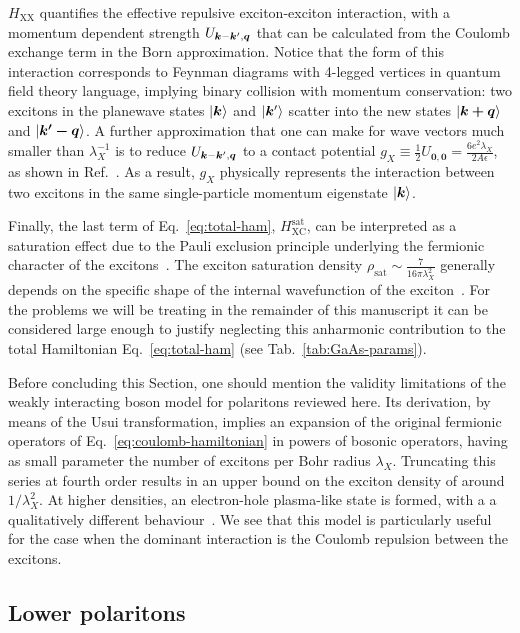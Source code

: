 $H_{\text{XX}}$ quantifies the effective repulsive exciton-exciton
interaction, with a momentum dependent strength
$U_{\bm{k} - \bm{k}^{\prime},\bm{q}}$ that can be calculated from the
Coulomb exchange term in the Born approximation.  Notice that the
form of this interaction corresponds to Feynman diagrams with
4-legged vertices in quantum field theory language, implying binary
collision with momentum conservation: two excitons in the planewave
states $\vert \bm{k} \rangle$ and $\vert \bm{k}^{\prime} \rangle$ scatter into the new
states $\vert \bm{\bm{k}+\bm{q}} \rangle$ and $\vert \bm{\bm{k}^{\prime}-\bm{q}} \rangle$.
A further approximation that one can make for wave vectors much
smaller than $\lambda_X^{-1}$ is to reduce
$U_{\bm{k} - \bm{k}^{\prime},\bm{q}}$ to a contact potential
$g_X \equiv \frac{1}{2} U_{\bm{0},\bm{0}} =
\frac{6e^2\lambda_X}{2A\epsilon}$, as shown in
Ref.~\cite{Ciuti1998}. As a result, $g_X$ physically represents the
interaction between two excitons in the same single-particle momentum
eigenstate $\vert \bm{k} \rangle$.

Finally, the last term of Eq.~\eqref{eq:total-ham},
$H_{\text{XC}}^{\text{sat}}$, can be interpreted as a saturation
effect due to the Pauli exclusion principle underlying the fermionic
character of the excitons~\cite{Tassone1999}. The exciton saturation
density $\rho_{\text{sat}} \sim \frac{7}{16\pi\lambda_X^2}$ generally
depends on the specific shape of the internal wavefunction of the
exciton~\cite{Glazov2009}.  For the problems we will be treating in
the remainder of this manuscript it can be considered large enough to
justify neglecting this anharmonic contribution to the total
Hamiltonian Eq.~\eqref{eq:total-ham} (see Tab.~\ref{tab:GaAs-params}).

Before concluding this Section, one should mention the validity
limitations of the weakly interacting boson model for polaritons
reviewed here. Its derivation, by means of the Usui transformation,
implies an expansion of the original fermionic operators of
Eq.~\eqref{eq:coulomb-hamiltonian} in powers of bosonic operators,
having as small parameter the number of excitons per Bohr radius
$\lambda_X$. Truncating this series at fourth order results in an
upper bound on the exciton density of around $1/\lambda_X^2$. At
higher densities, an electron-hole plasma-like state is formed, with a
a qualitatively different behaviour~\cite{COMBESCOT2008}.  We see that
this model is particularly useful for the case when the dominant
interaction is the Coulomb repulsion between the excitons.

\subsection{Lower polaritons}
\label{subsec:lower-polaritons}

